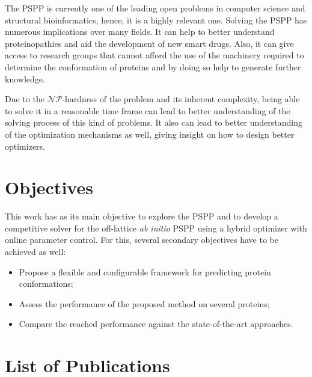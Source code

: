 The \ac{PSPP} is currently one of the leading open problems in computer science and
structural bioinformatics, hence, it is a highly relevant one. Solving
the \ac{PSPP} has numerous implications over many fields. It can help to better
understand proteinopathies and aid the development of new smart drugs.
Also, it can give access to research groups that cannot afford the use of the
machinery required to determine the conformation of proteins and by doing so
help to generate further knowledge.

Due to the $\mathcal{NP}$-hardness of the problem and its inherent complexity,
being able to solve it in a reasonable time frame can lead to better
understanding of the solving process of this kind of problems. It also can lead
to better understanding of the optimization mechanisms as well, giving insight on
how to design better optimizers.

\section{Objectives}\label{sec:chap1_objectives}

This work has as its main objective to explore the \ac{PSPP} and to develop a
competitive solver for the off-lattice \textit{ab initio} \ac{PSPP} using a
hybrid optimizer with online parameter control. For this, several secondary
objectives have to be achieved as well:

\begin{itemize}
    \item Propose a flexible and configurable framework for predicting protein conformations;
    \item Assess the performance of the proposed method on several proteins;
    \item Compare the reached performance against the state-of-the-art approaches.
\end{itemize}


\section{List of Publications}\label{sec:list_of_publications}

